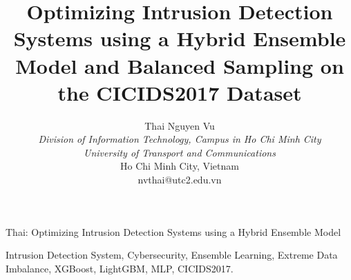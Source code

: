 \documentclass[journal,10pt]{IEEEtran}
\begin{document}
\title{Optimizing Intrusion Detection Systems using a Hybrid Ensemble Model and Balanced Sampling on the CICIDS2017 Dataset}

\author{Thai Nguyen Vu \\
\textit{Division of Information Technology, Campus in Ho Chi Minh City} \\
\textit{University of Transport and Communications} \\
Ho Chi Minh City, Vietnam \\
nvthai@utc2.edu.vn}
%
{Thai: Optimizing Intrusion Detection Systems using a Hybrid Ensemble Model}

\maketitle



\begin{IEEEkeywords}
Intrusion Detection System, Cybersecurity, Ensemble Learning, Extreme Data Imbalance, XGBoost, LightGBM, MLP, CICIDS2017.
\end{IEEEkeywords}










\end{document}
